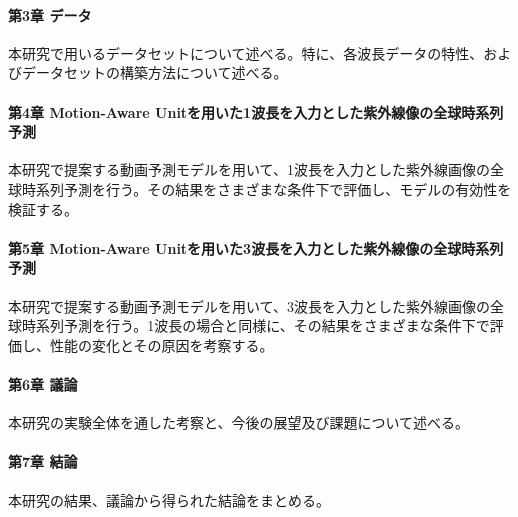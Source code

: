   \paragraph{第3章 データ}
    本研究で用いるデータセットについて述べる。特に、各波長データの特性、およびデータセットの構築方法について述べる。
  \paragraph{第4章 Motion-Aware Unitを用いた1波長を入力とした紫外線像の全球時系列予測}
    本研究で提案する動画予測モデルを用いて、1波長を入力とした紫外線画像の全球時系列予測を行う。その結果をさまざまな条件下で評価し、モデルの有効性を検証する。
  \paragraph{第5章 Motion-Aware Unitを用いた3波長を入力とした紫外線像の全球時系列予測}
    本研究で提案する動画予測モデルを用いて、3波長を入力とした紫外線画像の全球時系列予測を行う。1波長の場合と同様に、その結果をさまざまな条件下で評価し、性能の変化とその原因を考察する。
  \paragraph{第6章 議論}
    本研究の実験全体を通した考察と、今後の展望及び課題について述べる。
  \paragraph{第7章 結論}
    本研究の結果、議論から得られた結論をまとめる。


